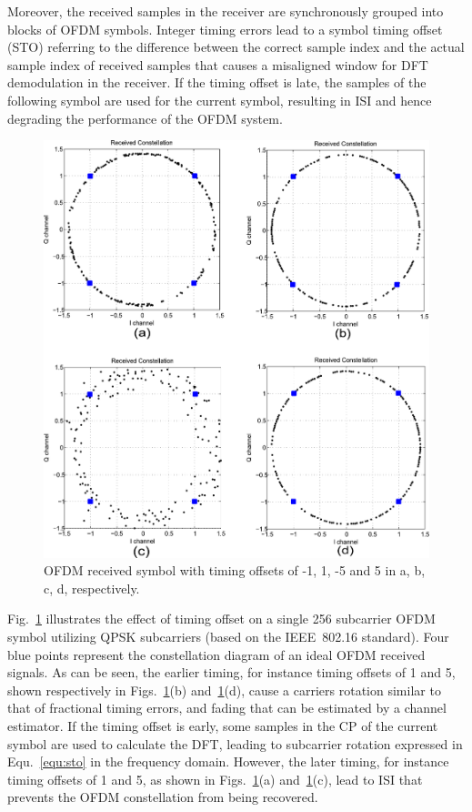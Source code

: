 Moreover, the received samples in the receiver are synchronously grouped into blocks of OFDM symbols.
Integer timing errors lead to a symbol timing offset (STO) referring to the difference between the correct sample index and the actual sample index of received samples that causes a misaligned window for DFT demodulation in the receiver.
If the timing offset is late, the samples of the following symbol are used for the current symbol, resulting in ISI and hence degrading the performance of the OFDM system. 
\begin{figure}
	\centerline{\includegraphics [width=0.8\columnwidth] {Figures/timeoff.pdf} }
	\caption{OFDM received symbol with timing offsets of -1, 1, -5 and 5 in a, b, c, d, respectively.}
	\label{fig:Timingoffsetconstellation}
\end{figure}

Fig.~\ref{fig:Timingoffsetconstellation} illustrates the effect of timing offset on a single 256 subcarrier OFDM symbol utilizing QPSK subcarriers (based on the IEEE~802.16 standard).
Four blue points represent the constellation diagram of an ideal OFDM received signals.
As can be seen, the earlier timing, for instance timing offsets of 1 and 5, shown respectively in Figs.~\ref{fig:Timingoffsetconstellation}(b) and~\ref{fig:Timingoffsetconstellation}(d), cause a carriers rotation similar to that of fractional timing errors, and fading that can be estimated by a channel estimator.
If the timing offset is early, some samples in the CP of the current symbol are used to calculate the DFT, leading to subcarrier rotation expressed in Equ.~\ref{equ:sto} in the frequency domain.
However, the later timing, for instance timing offsets of 1 and 5, as shown in Figs.~\ref{fig:Timingoffsetconstellation}(a) and~\ref{fig:Timingoffsetconstellation}(c), lead to ISI that prevents the OFDM constellation from being recovered.

